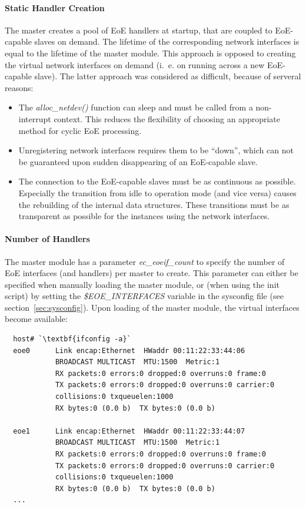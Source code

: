\documentclass[a4paper,12pt,BCOR6mm,bibtotoc,idxtotoc]{scrbook}
\begin{document}
\paragraph{Static Handler Creation}

The master creates a pool of EoE handlers at startup, that are coupled
to EoE-capable slaves on demand. The lifetime of the corresponding
network interfaces is equal to the lifetime of the master module.
This approach is opposed to creating the virtual network interfaces on
demand (i.~e. on running across a new EoE-capable slave). The latter
approach was considered as difficult, because of serveral reasons:

\begin{itemize}
\item The \textit{alloc\_netdev()} function can sleep and must be
  called from a non-interrupt context. This reduces the flexibility of
  choosing an appropriate method for cyclic EoE processing.
\item Unregistering network interfaces requires them to be ``down'',
  which can not be guaranteed upon sudden disappearing of an
  EoE-capable slave.
\item The connection to the EoE-capable slaves must be as continuous
  as possible. Especially the transition from idle to operation mode
  (and vice versa) causes the rebuilding of the internal data
  structures. These transitions must be as transparent as possible for
  the instances using the network interfaces.
\end{itemize}

\paragraph{Number of Handlers}

The master module has a parameter \textit{ec\_eoeif\_count} to specify
the number of EoE interfaces (and handlers) per master to create. This
parameter can either be specified when manually loading the master
module, or (when using the init script) by setting the
\textit{\$EOE\_INTERFACES} variable in the sysconfig file (see
section~\ref{sec:sysconfig}). Upon loading of the master module, the
virtual interfaces become available:

\begin{lstlisting}
  host# `\textbf{ifconfig -a}`
  eoe0      Link encap:Ethernet  HWaddr 00:11:22:33:44:06
            BROADCAST MULTICAST  MTU:1500  Metric:1
            RX packets:0 errors:0 dropped:0 overruns:0 frame:0
            TX packets:0 errors:0 dropped:0 overruns:0 carrier:0
            collisions:0 txqueuelen:1000
            RX bytes:0 (0.0 b)  TX bytes:0 (0.0 b)

  eoe1      Link encap:Ethernet  HWaddr 00:11:22:33:44:07
            BROADCAST MULTICAST  MTU:1500  Metric:1
            RX packets:0 errors:0 dropped:0 overruns:0 frame:0
            TX packets:0 errors:0 dropped:0 overruns:0 carrier:0
            collisions:0 txqueuelen:1000
            RX bytes:0 (0.0 b)  TX bytes:0 (0.0 b)
  ...
\end{lstlisting}
\end{document}
